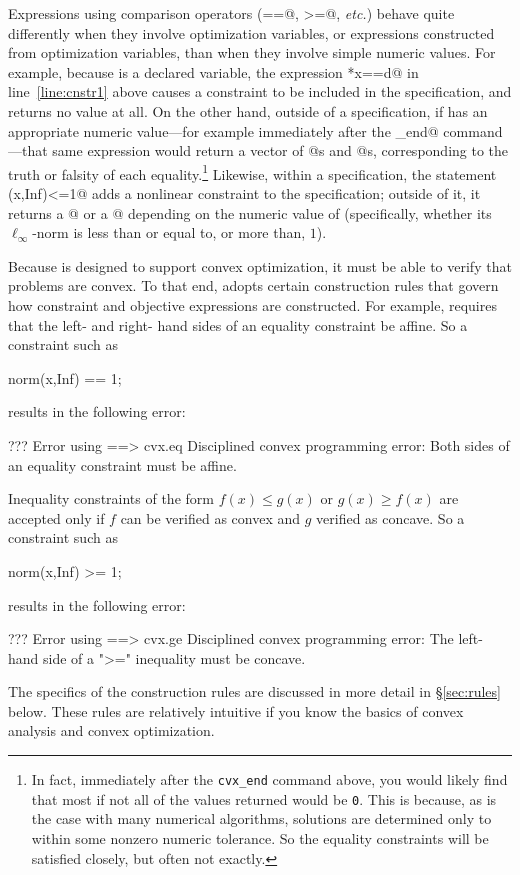 \documentclass[12pt]{article}
\begin{document}
Expressions using comparison operators (\verb@==@, \verb@>=@, \emph{etc.})
behave quite differently when they involve \cvx optimization variables,
or expressions constructed from \cvx optimization variables,
than when they involve simple numeric values. For example, because \verb@x@
is a declared variable, the expression \verb@C*x==d@ in line~\ref{line:cnstr1}
above causes a constraint to be included in the \cvx specification,
and returns no value at all. 
On the other hand, outside of a \cvx specification,
if \verb@x@ has an appropriate numeric value---for example immediately 
after the \verb@cvx_end@ command---that same expression would return a vector of
@s and @s, corresponding to the truth or falsity of each 
equality.\footnote{In fact, immediately after the
\texttt{cvx\_end} command above, you would likely find that most if not
all of the values returned would be \texttt{0}. This
is because, as is the case with many numerical algorithms, solutions 
are determined only 
to within some nonzero numeric tolerance. So the equality constraints
will be satisfied closely, but often not exactly.} Likewise, within
a \cvx specification, the statement \verb@norm(x,Inf)<=1@ adds a
nonlinear constraint to the specification; outside of it, it
returns a @ or a @ depending on the numeric value 
of \verb@x@ (specifically, whether its $\ell_\infty$-norm
is less than or equal to, or more than, $1$).

Because \cvx is designed to support convex optimization, it must be
able to verify that problems are convex. To that end,
\cvx adopts certain construction rules
that govern how constraint and objective expressions are constructed.
For example, \cvx requires that the left- and right- hand sides of an
equality constraint be affine. So a constraint such as
\begin{code}
	norm(x,Inf) == 1;
\end{code}
results in the following error:
\begin{code}
??? Error using ==> cvx.eq
Disciplined convex programming error:
Both sides of an equality constraint must be affine.
\end{code}
Inequality constraints of the form $f(x) \leq g(x)$
or $g(x) \geq f(x)$
are accepted only if $f$ can be verified as convex and $g$
verified as concave. So a constraint such as
\begin{code}
	norm(x,Inf) >= 1;
\end{code}
results in the following error:
\begin{code}
??? Error using ==> cvx.ge
Disciplined convex programming error:
The left-hand side of a ">=" inequality must be concave.
\end{code}
The specifics of the construction rules are discussed in
more detail in \S\ref{sec:rules} below.  
These rules are relatively intuitive if you know the basics of
convex analysis and convex optimization.
\end{document}
